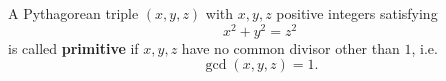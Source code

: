 A Pythagorean triple $(x, y, z)$ with $x, y, z$ positive integers satisfying
$$x^2 + y^2 = z^2$$
is called \textbf{primitive} if $x, y, z$ have no common divisor other than $1$, i.e.
$$\gcd(x, y, z) = 1.$$
